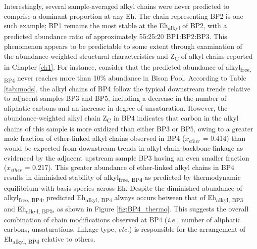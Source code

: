 Interestingly, several sample-averaged alkyl chains were never predicted to comprise a dominant proportion at any Eh. The chain representing BP2 is one such example; BP1 remains the most stable at the Eh\textsubscript{alkyl} of BP2, with a predicted abundance ratio of approximately 55:25:20 BP1:BP2:BP3. This phenomenon appears to be predictable to some extent through examination of the abundance-weighted structural characteristics and Z\textsubscript{C} of alkyl chains reported in Chapter \ref{ch1}. For instance, consider that the predicted abundance of alkyl\textsubscript{free, BP4} never reaches more than 10\% abundance in Bison Pool. According to Table \ref{tab:mods}, the alkyl chains of BP4 follow the typical downstream trends relative to adjacent samples BP3 and BP5, including a decrease in the number of aliphatic carbons and an increase in degree of unsaturation. However, the abundance-weighted alkyl chain Z\textsubscript{C} in BP4 indicates that carbon in the alkyl chains of this sample is more oxidized than either BP3 or BP5, owing to a greater mole fraction of ether-linked alkyl chains observed in BP4 ($x_{ether}$ = 0.414) than would be expected from downstream trends in alkyl chain-backbone linkage as evidenced by the adjacent upstream sample BP3 having an even smaller fraction ($x_{ether}$ = 0.217). This greater abundance of ether-linked alkyl chains in BP4 results in diminished stability of alkyl\textsubscript{free, BP4} as predicted by thermodynamic equilibrium with basis species across Eh. Despite the diminished abundance of alkyl\textsubscript{free, BP4}, predicted Eh\textsubscript{alkyl, BP4} always occurs between that of Eh\textsubscript{alkyl, BP3} and Eh\textsubscript{alkyl, BP5}, as shown in Figure \ref{fig:BP4_thermo}. This suggests the overall combination of chain modifications observed at BP4 (\textit{i.e.}, number of aliphatic carbons, unsaturations, linkage type, \textit{etc.}) is responsible for the arrangement of Eh\textsubscript{alkyl, BP4} relative to others.

